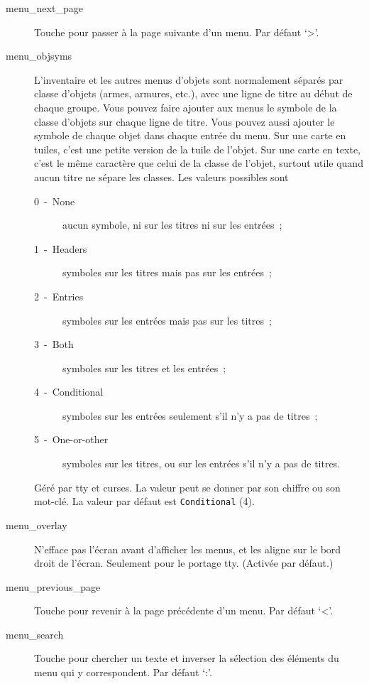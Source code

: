 \documentclass[titlepage]{article}
\begin{document}
\begin{description}
\item[{menu\_next\_page}]
Touche pour passer à la page suivante d'un menu.
Par défaut `\textgreater{}'.

\item[{menu\_objsyms}]
L'inventaire et les autres menus d'objets sont normalement séparés par
classe d'objets (armes, armures, etc.), avec une ligne de titre au début de
chaque groupe.
Vous pouvez faire ajouter aux menus le symbole de la classe d'objets sur
chaque ligne de titre.
Vous pouvez aussi ajouter le symbole de chaque objet dans chaque entrée du
menu.
Sur une carte en tuiles, c'est une petite version de la tuile de l'objet.
Sur une carte en texte, c'est le même caractère que celui de la classe de
l'objet, surtout utile quand aucun titre ne sépare les classes.
Les valeurs possibles sont
\begin{description}
\item[{0~-~None}]
aucun symbole, ni sur les titres ni sur les entrées~;
\item[{1~-~Headers}]
symboles sur les titres mais pas sur les entrées~;
\item[{2~-~Entries}]
symboles sur les entrées mais pas sur les titres~;
\item[{3~-~Both}]
symboles sur les titres et les entrées~;
\item[{4~-~Conditional}]
symboles sur les entrées seulement s'il n'y a pas de titres~;
\item[{5~-~One-or-other}]
symboles sur les titres, ou sur les entrées s'il n'y a pas de titres.
\end{description}
Géré par tty et curses.
La valeur peut se donner par son chiffre ou son mot-clé.
La valeur par défaut est \texttt{Conditional} (4).

\item[{menu\_overlay}]
N'efface pas l'écran avant d'afficher les menus, et les aligne sur le bord
droit de l'écran.
Seulement pour le portage tty.
(Activée par défaut.)

\item[{menu\_previous\_page}]
Touche pour revenir à la page précédente d'un menu.
Par défaut `\textless{}'.

\item[{menu\_search}]
Touche pour chercher un texte et inverser la sélection des éléments du
menu qui y correspondent.
Par défaut `:'.


\end{description}
\end{document}
